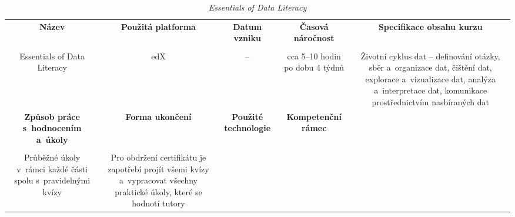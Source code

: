 \begin{landscape}

\begin{table}[htbp]

\renewcommand\thetable{5}

\caption{\textit{Essentials of Data Literacy}}\label{tab4}

\footnotesize

{

\justifying

\begin{tabularx}{\linewidth}{CCCCC}

\toprule

\textbf{Název} &

\textbf{Použitá platforma} &

\textbf{Datum vzniku} &

\textbf{Časová náročnost} &
 
\textbf{Specifikace obsahu kurzu}

\\

\tabularnewline
\midrule

Essentials of Data Literacy

&

edX

&

–

&

cca 5–10 hodin po dobu 4 týdnů

&

Životní cyklus dat – definování otázky, sběr a~organizace dat, čištění dat, explorace a~vizualizace dat, analýza a~interpretace dat, komunikace prostřednictvím nasbíraných dat

\\
\toprule

\textbf{Způsob práce s~hodnocením a~úkoly} &

\textbf{Forma ukončení} &

\textbf{Použité technologie} &

\textbf{Kompetenční rámec} 

\\

\tabularnewline
\midrule

Průběžné úkoly v~rámci každé části spolu s~pravidelnými kvízy

&

Pro obdržení certifikátu je zapotřebí projít všemi kvízy a~vypracovat všechny praktické úkoly, které se hodnotí tutory


\end{tabularx}}
\end{table}
\end{landscape}
